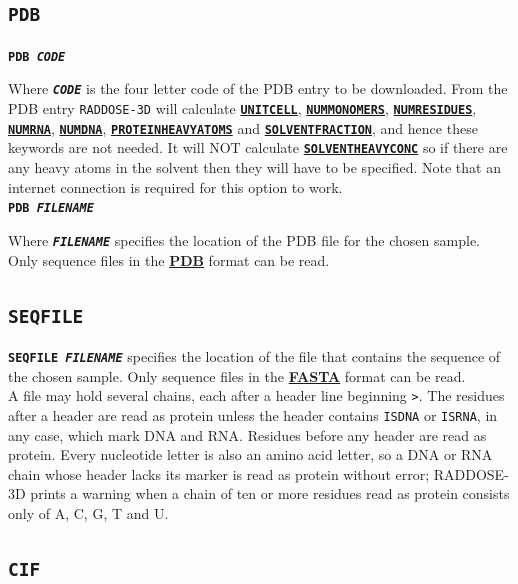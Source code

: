 \documentclass[a4paper]{article}
\newcommand{\RD}{\texttt{RADDOSE-3D}\xspace}
\newcommand{\Keyword}[1]{\texttt{\textbf{#1}}\xspace}
\newcommand{\SB}{\\[0.2em]}
\begin{document}
\subsection{\Keyword{PDB}}
\label{pdb}

\noindent \Keyword{PDB \textit{CODE}}

Where \Keyword{\textit{CODE}} is the four letter code of the PDB entry to be downloaded. From the PDB entry \RD will calculate
 \hyperref[unitcell]{\Keyword{UNITCELL}},
 \hyperref[nummonomers]{\Keyword{NUMMONOMERS}},
 \hyperref[numresidues]{\Keyword{NUMRESIDUES}},
 \hyperref[numrna]{\Keyword{NUMRNA}},
 \hyperref[numdna]{\Keyword{NUMDNA}},
 \hyperref[proteinheavyatoms]{\Keyword{PROTEINHEAVYATOMS}} and
 \hyperref[solventfraction]{\Keyword{SOLVENTFRACTION}}, and hence these keywords are not needed.
It will NOT calculate \hyperref[solventheavyconc]{\Keyword{SOLVENTHEAVYCONC}} so if there are any heavy atoms in the solvent then they will have to be specified. Note that an internet connection is required for this option to work. \SB

\noindent \Keyword{PDB \textit{FILENAME}}

Where \Keyword{\textit{FILENAME}} specifies the location of the PDB file for the chosen sample. 
Only sequence files in the \href{https://en.wikipedia.org/wiki/Protein_Data_Bank_(file_format)}{\textbf{PDB}} format can be read. \SB


\subsection{\Keyword{SEQFILE}}
\label{seqfile}

\Keyword{SEQFILE \textit{FILENAME}} specifies the location of the file that contains the sequence of the chosen sample.
Only sequence files in the \href{https://en.wikipedia.org/wiki/FASTA_format}{\textbf{FASTA}} format can be read. \SB

A file may hold several chains, each after a header line beginning \texttt{>}. The residues after a header are read as protein unless the header contains \texttt{ISDNA} or \texttt{ISRNA}, in any case, which mark DNA and RNA. Residues before any header are read as protein. Every nucleotide letter is also an amino acid letter, so a DNA or RNA chain whose header lacks its marker is read as protein without error; RADDOSE-3D prints a warning when a chain of ten or more residues read as protein consists only of A, C, G, T and U. \SB

\subsection{\Keyword{CIF}}
\label{cif}
\end{document}

